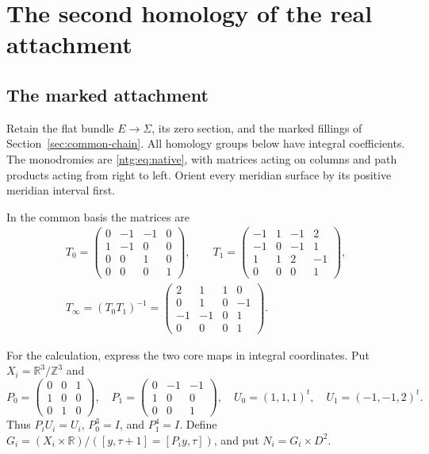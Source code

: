 \section{The second homology of the real attachment}\label{sec:second-homology}

\subsection{The marked attachment}

Retain the flat bundle $E\to\Sigma$, its zero section, and the marked
fillings of Section~\ref{sec:common-chain}. All homology groups below
have integral coefficients. The monodromies are
\eqref{ntg:eq:native}, with matrices acting on columns and path
products acting from right to left. Orient every meridian surface by
its positive meridian interval first.

In the common basis the matrices are
\begin{equation}\label{mt:eq:monodromy}
\begin{gathered}
T_0=\begin{pmatrix}0&-1&-1&0\\1&-1&0&0\\0&0&1&0\\0&0&0&1\end{pmatrix},\qquad
T_1=\begin{pmatrix}-1&1&-1&2\\-1&0&-1&1\\1&1&2&-1\\0&0&0&1\end{pmatrix},\\
T_\infty=(T_0T_1)^{-1}
=\begin{pmatrix}2&1&1&0\\0&1&0&-1\\-1&-1&0&1\\0&0&0&1\end{pmatrix}.
\end{gathered}
\end{equation}

For the calculation, express the two core maps in integral coordinates.
Put $X_i=\mathbb R^3/\mathbb Z^3$ and
\[
P_0=\begin{pmatrix}0&0&1\\1&0&0\\0&1&0\end{pmatrix},\quad
P_1=\begin{pmatrix}0&-1&-1\\1&0&0\\0&0&1\end{pmatrix},\quad
U_0=(1,1,1)^t,\quad U_1=(-1,-1,2)^t.
\]
Thus $P_iU_i=U_i$, $P_0^3=I$, and $P_1^4=I$.
Define $G_i=(X_i\times\mathbb R)/([y,\tau+1]=[P_i y,\tau])$,
and put $N_i=G_i\times D^2$.


